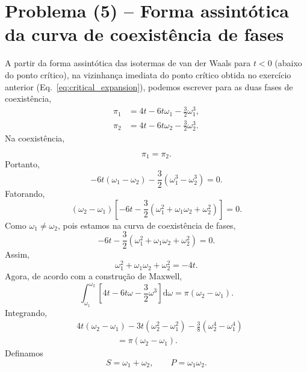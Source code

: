 \documentclass[11pt,a4paper]{article}
\renewcommand{\dd}{\mathrm{d}}
\begin{document}
\section*{Problema (5) -- Forma assintótica da curva de coexistência de fases}
%
A partir da forma assintótica das isotermas de van der Waals para $t<0$ (abaixo do ponto crítico), na vizinhança imediata do ponto crítico obtida no exercício anterior (Eq.~\ref{eq:critical_expansion}), podemos escrever para as duas fases de coexistência,
%
\begin{align}
    \pi_1
    &=
    4t-6t\omega_1-\frac32\omega_1^3,
    \label{eq:pi1}
    \\
    \pi_2
    &=
    4t-6t\omega_2-\frac32\omega_2^3.
    \label{eq:pi2}
\end{align}
%
Na coexistência,

\begin{equation}
    \pi_1=\pi_2.
\end{equation}
%
Portanto,
%
\begin{equation}
    -6t(\omega_1-\omega_2)
    -
    \frac32(\omega_1^3-\omega_2^3)
    =0.
\end{equation}
%
Fatorando,
%
\begin{equation}
    (\omega_2-\omega_1)
    \left[
    -6t
    -
    \frac32
    (\omega_1^2+\omega_1\omega_2+\omega_2^2)
    \right]
    =0.
\end{equation}
%
Como $\omega_1\neq\omega_2$, pois estamos na curva de coexistência de fases,
%
\begin{equation}
    -6t
    -
    \frac32
    (\omega_1^2+\omega_1\omega_2+\omega_2^2)=0.
\end{equation}
%
Assim,
%
\begin{equation}    
\omega_1^2+\omega_1\omega_2+\omega_2^2=-4t.
\label{eq:pressure_condition}
\end{equation}
%
Agora, de acordo com a construção de Maxwell,
%
\begin{equation}
    \int_{\omega_1}^{\omega_2}
    \left[
    4t-6t\omega-\frac32\omega^3
    \right]\dd\omega
    =
    \pi(\omega_2-\omega_1).
\end{equation}
%
Integrando,
%
\begin{align}
    &4t(\omega_2-\omega_1)
    -
    3t(\omega_2^2-\omega_1^2)
    -
    \frac38(\omega_2^4-\omega_1^4)
    \nonumber\\
    &\hspace{2cm}
    =
    \pi(\omega_2-\omega_1).
\end{align}
%
Definamos
%
\begin{equation}
    S=\omega_1+\omega_2,
    \qquad
    P=\omega_1\omega_2.
\end{equation}
\end{document}
